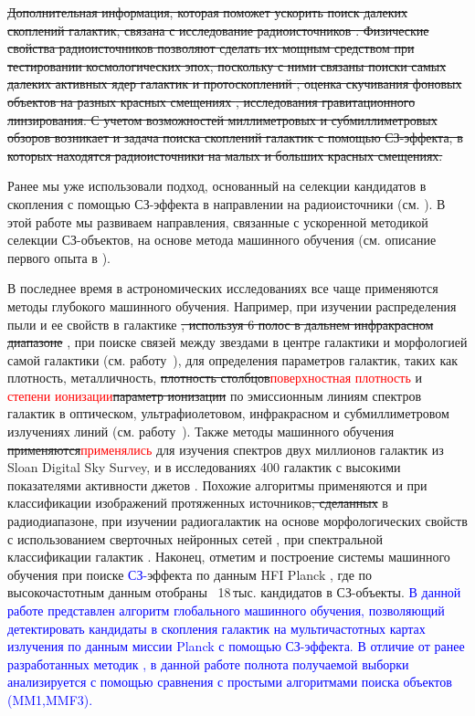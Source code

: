 \documentclass[
aps,%
12pt,%
final,%
notitlepage,%
oneside,%
onecolumn,%
nobibnotes,%
nofootinbib,%
superscriptaddress,%
noshowpacs,%
centertags]%
{revtex4}
\begin{document}
\sout{Дополнительная информация, которая поможет ускорить поиск далеких скоплений галактик, связана с исследование радиоисточников \cite{blum_miley,rg_list1,rg_book}. Физические свойства радиоисточников позволяют сделать их мощным средством при тестировании космологических эпох, поскольку с ними связаны поиски самых далеких активных ядер галактик \cite{par_big3a,uss_list} и протоскоплений \cite{rg_protocl}, оценка скучивания фоновых объектов на разных красных смещениях \cite{rg_protocl,tim_clust}, исследования гравитационного линзирования. С учетом возможностей миллиметровых и субмиллиметровых обзоров возникает и задача поиска скоплений галактик с помощью СЗ-эффекта, в которых находятся радиоисточники на малых и больших красных смещениях.}

Ранее мы уже использовали подход, основанный на селекции кандидатов в скопления с помощью СЗ-эффекта в направлении на радиоисточники (см. \cite{rc_planck,wenss_sz,traj_zaporozhets}). В этой работе мы развиваем направления, связанные с ускоренной методикой селекции СЗ-объектов, на основе метода машинного обучения (см. описание первого опыта в \cite{oron_habr}).

В последнее время в астрономических исследованиях все чаще применяются методы глубокого машинного обучения. Например, при изучении распределения пыли и ее свойств в галактике \sout{, используя 6 полос в дальнем инфракрасном диапазоне} \textcolor{red}{} \cite{Dobbels}, при поиске связей между звездами в центре галактики и морфологией самой галактики (см. работу~\cite{Tacchella}), для определения параметров галактик, таких как плотность, металличность, \sout{плотность столбцов}\textcolor{red}{поверхностная плотность} и \textcolor{red}{степени ионизации}\sout{параметр ионизации} по эмиссионным линиям спектров галактик в оптическом, ультрафиолетовом, инфракрасном и субмиллиметровом излучениях линий (см. работу~\cite{Ucci}). Также методы машинного обучения \sout{применяются}\textcolor{red}{применялись} для изучения спектров двух миллионов галактик из Sloan Digital Sky Survey, и в исследованиях 400 галактик с высокими показателями активности джетов \cite{Baron}. Похожие алгоритмы применяются и при классификации изображений протяженных источников\sout{, сделанных} в радиодиапазоне, при изучении радиогалактик на основе морфологических свойств с использованием сверточных нейронных сетей \cite{Aniyan}, при спектральной классификации галактик \cite{Tao}. Наконец, отметим и построение системы машинного обучения при поиске \textcolor{blue}{СЗ-}эффекта по данным HFI Planck \cite{Bonjean2019}, где по высокочастотным данным отобраны ~18\,тыс. кандидатов в СЗ-объекты. \textcolor{blue}{В данной работе представлен алгоритм глобального машинного обучения, позволяющий детектировать кандидаты в скопления галактик на мультичастотных картах излучения по данным миссии Planck с помощью  СЗ-эффекта. В отличие от ранее разработанных методик \cite{Bonjean2019, Melin, Herranz}, в данной работе полнота получаемой выборки анализируется с помощью сравнения с простыми алгоритмами поиска объектов (MM1,MMF3).}
\end{document}
